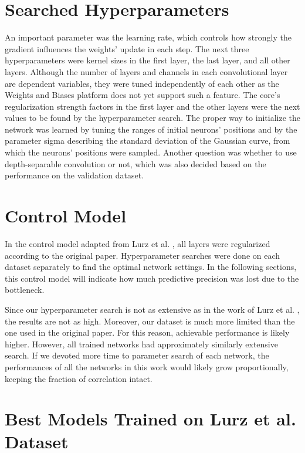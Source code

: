 \section{Searched Hyperparameters}

An important parameter was the learning rate, which controls how strongly the gradient influences the weights’ update in each step. The next three hyperparameters were kernel sizes in the first layer, the last layer, and all other layers. Although the number of layers and channels in each convolutional layer are dependent variables, they were tuned independently of each other as the Weights and Biases platform does not yet support such a feature. The core's regularization strength factors in the first layer and the other layers were the next values to be found by the hyperparameter search. The proper way to initialize the network was learned by tuning the ranges of initial neurons' positions and by the parameter sigma describing the standard deviation of the Gaussian curve, from which the neurons' positions were sampled. Another question was whether to use depth-separable convolution or not, which was also decided based on the performance on the validation dataset.

\section{Control Model}

In the control model adapted from Lurz et al. \citep{lurz2021generalization}, all layers were regularized according to the original paper. Hyperparameter searches were done on each dataset separately to find the optimal network settings. In the following sections, this control model will indicate how much predictive precision was lost due to the bottleneck. 

Since our hyperparameter search is not as extensive as in the work of Lurz et al. \citep{lurz2021generalization}, the results are not as high. Moreover, our dataset is much more limited than the one used in the original paper. For this reason, achievable performance is likely higher. However, all trained networks had approximately similarly extensive search. If we devoted more time to parameter search of each network, the performances of all the networks in this work would likely grow proportionally, keeping the fraction of correlation intact. 

\section{Best Models Trained on Lurz et al. Dataset}\label{best_lurz_section}

